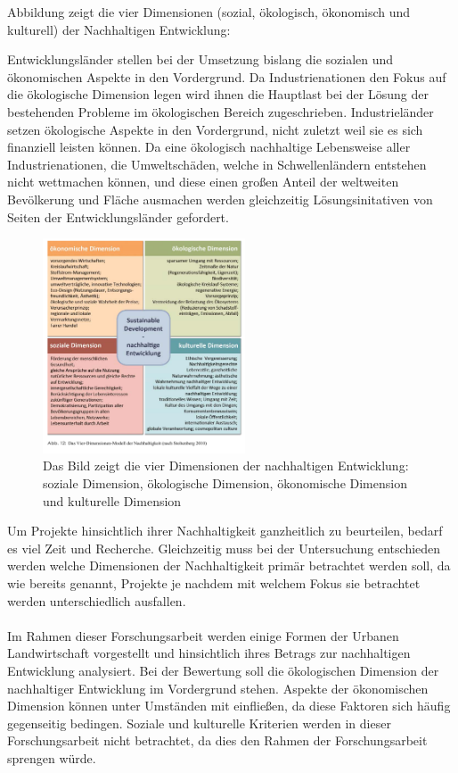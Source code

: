 \documentclass{scrartcl}
\begin{document}
Abbildung \label{fig:4-dimensionen Modell} zeigt die vier Dimensionen (sozial, ökologisch, ökonomisch und kulturell) der Nachhaltigen Entwicklung: 

Entwicklungsländer stellen bei der Umsetzung bislang die sozialen und ökonomischen Aspekte in den Vordergrund. Da Industrienationen den Fokus auf die ökologische Dimension legen wird ihnen die Hauptlast bei der Lösung der bestehenden Probleme im ökologischen Bereich zugeschrieben. Industrieländer setzen ökologische Aspekte in den Vordergrund, nicht zuletzt weil sie es sich finanziell leisten können. Da eine ökologisch nachhaltige Lebensweise aller Industrienationen, die Umweltschäden, welche in Schwellenländern entstehen nicht wettmachen können, und diese einen großen Anteil der weltweiten Bevölkerung und Fläche ausmachen werden gleichzeitig Lösungsinitativen von Seiten der Entwicklungsländer gefordert.

\begin{figure}[h]
\centering
\includegraphics[width=6cm]{image_folder/vierdimensionenmodell_der_N.png}
\caption{Das Bild zeigt die vier Dimensionen der nachhaltigen Entwicklung: soziale Dimension, ökologische Dimension, ökonomische Dimension und kulturelle Dimension}
\label{fig:4-dimensionen Modell}
\end{figure}



Um Projekte hinsichtlich ihrer Nachhaltigkeit ganzheitlich zu beurteilen, bedarf es viel Zeit und Recherche. Gleichzeitig muss bei der Untersuchung entschieden werden welche Dimensionen der Nachhaltigkeit primär betrachtet werden soll, da wie bereits genannt, Projekte je nachdem mit welchem Fokus sie betrachtet werden unterschiedlich ausfallen.\\
\\
Im Rahmen dieser Forschungsarbeit werden einige Formen der Urbanen Landwirtschaft vorgestellt und hinsichtlich ihres Betrags zur nachhaltigen Entwicklung analysiert. Bei der Bewertung soll die ökologischen Dimension der nachhaltiger Entwicklung im Vordergrund stehen. Aspekte der ökonomischen Dimension können unter Umständen mit einfließen, da diese Faktoren sich häufig gegenseitig bedingen. Soziale und kulturelle Kriterien werden in dieser Forschungsarbeit nicht betrachtet, da dies den Rahmen der Forschungsarbeit sprengen würde.
\end{document}
